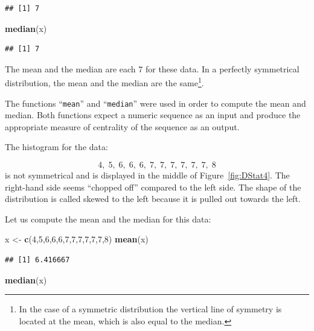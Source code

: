 \documentclass[
]{krantz}
\makeatletter
\newenvironment{Shaded}{\begin{snugshade}}{\end{snugshade}}
\newcommand{\DecValTok}[1]{\textcolor[rgb]{0.00,0.00,0.81}{#1}}
\newcommand{\KeywordTok}[1]{\textcolor[rgb]{0.13,0.29,0.53}{\textbf{#1}}}
\newcommand{\NormalTok}[1]{#1}
\newcommand{\StringTok}[1]{\textcolor[rgb]{0.31,0.60,0.02}{#1}}
\newenvironment{kframe}{%
\medskip{}
\setlength{\fboxsep}{.8em}
 \def\at@end@of@kframe{}%
 \ifinner\ifhmode%
  \def\at@end@of@kframe{\end{minipage}}%
  \begin{minipage}{\columnwidth}%
 \fi\fi%
 \def\FrameCommand##1{\hskip\@totalleftmargin \hskip-\fboxsep
 \colorbox{shadecolor}{##1}\hskip-\fboxsep
     \hskip-\linewidth \hskip-\@totalleftmargin \hskip\columnwidth}%
 \MakeFramed {\advance\hsize-\width
   \@totalleftmargin\z@ \linewidth\hsize
   \@setminipage}}%
 {\par\unskip\endMakeFramed%
 \at@end@of@kframe}
\renewenvironment{Shaded}{\begin{kframe}}{\end{kframe}}
\theoremstyle{definition}
\theoremstyle{definition}
\theoremstyle{definition}
\theoremstyle{remark}
\makeatother
\begin{document}
\begin{verbatim}
## [1] 7
\end{verbatim}

\begin{Shaded}
\begin{Highlighting}[]
\KeywordTok{median}\NormalTok{(x)}
\end{Highlighting}
\end{Shaded}

\begin{verbatim}
## [1] 7
\end{verbatim}

The mean and the median are each 7 for these data. In a perfectly
symmetrical distribution, the mean and the median are the same\footnote{In the case of a symmetric distribution the vertical line of
  symmetry is located at the mean, which is also equal to the median.}.

The functions ``\texttt{mean}'' and ``\texttt{median}'' were used in order to compute the
mean and median. Both functions expect a numeric sequence as an input
and produce the appropriate measure of centrality of the sequence as an
output.

The histogram for the data:

\[4,\;  5,\;  6,\;  6,\;  6,\;  7,\;  7,\;  7,\;  7,\;  7,\;  7,\;  8\]
is not symmetrical and is displayed in the middle of
Figure~\ref{fig:DStat4}. The right-hand side seems ``chopped
off'' compared to the left side. The shape of the distribution is called
skewed to the left because it is pulled out towards the left.

Let us compute the mean and the median for this data:

\begin{Shaded}
\begin{Highlighting}[]
\NormalTok{x <-}\StringTok{ }\KeywordTok{c}\NormalTok{(}\DecValTok{4}\NormalTok{,}\DecValTok{5}\NormalTok{,}\DecValTok{6}\NormalTok{,}\DecValTok{6}\NormalTok{,}\DecValTok{6}\NormalTok{,}\DecValTok{7}\NormalTok{,}\DecValTok{7}\NormalTok{,}\DecValTok{7}\NormalTok{,}\DecValTok{7}\NormalTok{,}\DecValTok{7}\NormalTok{,}\DecValTok{7}\NormalTok{,}\DecValTok{8}\NormalTok{)}
\KeywordTok{mean}\NormalTok{(x)}
\end{Highlighting}
\end{Shaded}

\begin{verbatim}
## [1] 6.416667
\end{verbatim}

\begin{Shaded}
\begin{Highlighting}[]
\KeywordTok{median}\NormalTok{(x)}
\end{Highlighting}
\end{Shaded}
\end{document}
